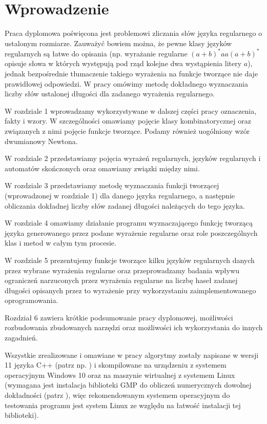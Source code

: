 \chapter*{Wprowadzenie}

Praca dyplomowa poświęcona jest problemowi zliczania słów języka regularnego o ustalonym rozmiarze. Zauważyć bowiem można, że pewne klasy języków regularnych są łatwe do opisania (np. wyrażanie regularne $(a+b)^*aa(a+b)^*$ opisuje słowa w których występują pod rząd kolejne dwa wystąpienia litery $a$), jednak bezpośrednie tłumaczenie takiego wyrażenia na funkcje tworzące nie daje prawidłowej odpowiedzi. W pracy omówimy metodę dokładnego wyznaczania liczby słów ustalonej długości dla zadanego wyrażenia regularnego.

W rozdziale 1 wprowadzamy wykorzystywane w dalszej części pracy oznaczenia, fakty i wzory. W szczególności omawiamy pojęcie klasy kombinatorycznej oraz związanych z nimi pojęcie funkcje tworzące. Podamy również uogólniony wzór dwumianowy Newtona.

W rozdziale 2 przedstawiamy pojęcia wyrażeń regularnych, języków regularnych i automatów skończonych oraz omawiamy związki między nimi. 

W rozdziale 3 przedstawiamy metodę wyznaczania funkcji tworzącej (wprowadzonej w rozdziale 1) dla danego języka regularnego, a następnie obliczania dokładnej liczby słów zadanej długości należących do tego języka.

W rozdziale 4 omawiamy działanie programu wyznaczającego funkcję tworzącą języka generowanego przez podane wyrażenie regularne oraz role poszczególnych klas i metod w całym tym procesie.

W rozdziale 5 prezentujemy funkcje tworzące kilku języków regularnych danych przez wybrane wyrażenia regularne oraz przeprowadzamy badania wpływu ograniczeń narzuconych przez wyrażenia regularne na liczbę haseł zadanej długości opisanych przez to wyrażenie przy wykorzystaniu zaimplementowanego oprogramowania.

Rozdział 6 zawiera krótkie podsumowanie pracy dyplomowej, możliwości rozbudowania zbudowanych narzędzi oraz możliwości ich wykorzystania do innych zagadnień. 

Wszystkie zrealizowane i omawiane w pracy algorytmy zostały napisane w wersji 11 języka C++ (patrz np. \cite{meyers2014effective}) i skompilowane na urządzeniu z systemem operacyjnym Windows 10 oraz na maszynie wirtualnej z systemem Linux (wymagana jest instalacja biblioteki GMP do obliczeń numerycznych dowolnej dokładności (patrz \cite{10.5555/2911024}), więc rekomendowanym systemem operacyjnym do testowania programu jest system Linux ze względu na łatwość instalacji tej biblioteki).